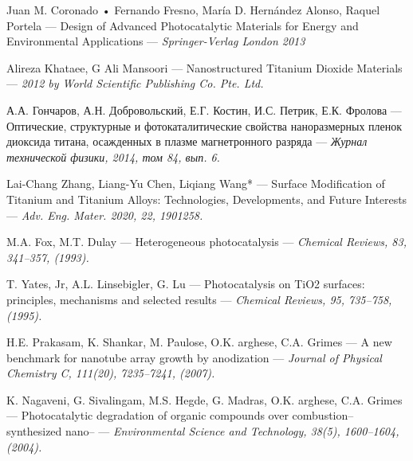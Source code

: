 \documentclass[oneside,final,12pt]{extreport}
\begin{document}
\newpage
\begin{thebibliography}{}

      Juan M. Coronado • Fernando Fresno, María D. Hernández Alonso,
Raquel Portela --- Design of Advanced Photocatalytic Materials for Energy and Environmental Applications --- \it{Springer-Verlag London 2013} \normalfont

      Alireza Khataee, G Ali Mansoori  ---  Nanostructured Titanium Dioxide Materials --- \it{2012 by World Scientific Publishing Co. Pte. Ltd.
} \normalfont
    
      А.А. Гончаров, А.Н. Добровольский, Е.Г. Костин, И.С. Петрик, Е.К. Фролова  ---  Оптические, структурные и фотокаталитические свойства наноразмерных пленок диоксида титана, осажденных в плазме магнетронного разряда --- \it {Журнал технической физики, 2014, том 84, вып. 6}. \normalfont
    
     Lai-Chang Zhang, Liang-Yu Chen, Liqiang Wang*  ---  Surface Modification of Titanium and Titanium Alloys: Technologies, Developments, and Future Interests --- \it {Adv. Eng. Mater. 2020, 22, 1901258}. \normalfont
    
     M.A. Fox, M.T. Dulay --- Heterogeneous photocatalysis --- \it{Chemical Reviews, 83, 341–357, (1993)}. \normalfont
    
     T. Yates, Jr, A.L. Linsebigler, G. Lu --- Photocatalysis on TiO2 surfaces: principles, mechanisms and selected results --- \it{Chemical Reviews, 95, 735–758, (1995)}. \normalfont
    
     H.E. Prakasam, K. Shankar, M. Paulose, O.K. arghese, C.A. Grimes --- A new benchmark for  nanotube array growth by anodization --- \it{Journal of Physical Chemistry C, 111(20), 7235–7241, (2007)}. \normalfont
    
     K. Nagaveni, G. Sivalingam, M.S. Hegde, G. Madras, O.K. arghese, C.A. Grimes --- Photocatalytic degradation of organic compounds over combustion–synthesized nano– --- \it{Environmental Science and Technology, 38(5), 1600–1604, (2004)}. \normalfont
    
\end{thebibliography}
\end{document}
